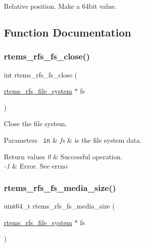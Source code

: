 Relative position. Make a 64bit value. 

\subsection{Function Documentation}
\mbox{\label{rtems-rfs-file-system_8h_af161538fcc5d88a33ec4b74ce530ae93}} 
\subsubsection{\texorpdfstring{rtems\_rfs\_fs\_close()}{rtems\_rfs\_fs\_close()}}
{\footnotesize\ttfamily int rtems\+\_\+rfs\+\_\+fs\+\_\+close (\begin{DoxyParamCaption}\item[{\mbox{\hyperlink{struct__rtems__rfs__file__system}{rtems\+\_\+rfs\+\_\+file\+\_\+system}} $\ast$}]{fs }\end{DoxyParamCaption})}

Close the file system.


\begin{DoxyParams}[1]{Parameters}
\mbox{\texttt{ in}}  & {\em fs} & is the file system data.\\
\hline
\end{DoxyParams}

\begin{DoxyRetVals}{Return values}
{\em 0} & Successful operation. \\
\hline
{\em -\/1} & Error. See errno \\
\hline
\end{DoxyRetVals}
\mbox{\label{rtems-rfs-file-system_8h_a8380bd35ff8e755dc1fe18f2de156f3c}} 
\subsubsection{\texorpdfstring{rtems\_rfs\_fs\_media\_size()}{rtems\_rfs\_fs\_media\_size()}}
{\footnotesize\ttfamily uint64\+\_\+t rtems\+\_\+rfs\+\_\+fs\+\_\+media\+\_\+size (\begin{DoxyParamCaption}\item[{\mbox{\hyperlink{struct__rtems__rfs__file__system}{rtems\+\_\+rfs\+\_\+file\+\_\+system}} $\ast$}]{fs }\end{DoxyParamCaption})}

